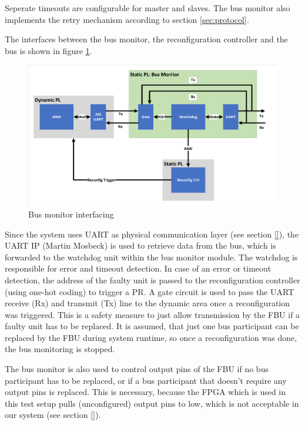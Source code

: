 Seperate timeouts are configurable for master and slaves. The bus monitor also implements the retry mechanism according to section \ref{sec:protocol}.

The interfaces between the bus monitor, the reconfiguration controller and the bus is shown in figure \ref{fig:BusMonitor}.

\begin{figure}[h!]
    \centering
    \includegraphics[width=\textwidth]{figures/BusMonitor.pdf}
    \caption{Bus monitor interfacing}\label{fig:BusMonitor}
\end{figure}

Since the system uses UART as physical communication layer (see section \ref{}), the UART IP (Martin Mosbeck) is used to retrieve data from the bus, which is forwarded to the watchdog unit within the bus monitor module. The watchdog is responsible for error and timeout detection. 
In case of an error or timeout detection, the address of the faulty unit is passed to the reconfiguration controller (using one-hot coding) to trigger a \gls{PR}. 
A gate circuit is used to pass the \gls{UART} receive (Rx) and transmit (Tx) line to the dynamic area once a reconfiguration was triggered. This is a safety measure to just allow transmission by the \gls{FBU} if a faulty unit has to be replaced. 
It is assumed, that just one bus participant can be replaced by the \gls{FBU} during system runtime, so once a reconfiguration was done, the bus monitoring is stopped.

The bus monitor is also used to control output pins of the \gls{FBU} if no bus participant has to be replaced, or if a bus participant that doesn't require any output pins is replaced. 
This is necessary, because the \gls{FPGA} which is used in this test setup pulls (unconfigured) output pins to low, which is not acceptable in our system (see section \ref{}).
